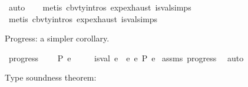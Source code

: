 \begin{isabellebody}
\ auto\isanewline
\ \ \isamarkupfalse%
\ {\isacharparenleft}{\kern0pt}metis\ cbv{\isacharunderscore}{\kern0pt}ty{\isachardot}{\kern0pt}intros{\isacharparenleft}{\kern0pt}{}{\isacharparenright}{\kern0pt}\ exp{\isachardot}{\kern0pt}exhaust\ is{\isacharunderscore}{\kern0pt}val{\isachardot}{\kern0pt}simps{\isacharparenleft}{\kern0pt}{}{\isacharcomma}{\kern0pt}{}{\isacharcomma}{\kern0pt}{}{\isacharparenright}{\kern0pt}{\isacharparenright}{\kern0pt}\isanewline
\ \ \isamarkupfalse%
\ {\isacharparenleft}{\kern0pt}metis\ cbv{\isacharunderscore}{\kern0pt}ty{\isachardot}{\kern0pt}intros{\isacharparenleft}{\kern0pt}{}{\isacharparenright}{\kern0pt}\ exp{\isachardot}{\kern0pt}exhaust\ is{\isacharunderscore}{\kern0pt}val{\isachardot}{\kern0pt}simps{\isacharparenleft}{\kern0pt}{}{\isacharcomma}{\kern0pt}{}{\isacharcomma}{\kern0pt}{}{\isacharparenright}{\kern0pt}{\isacharparenright}{\kern0pt}\isanewline
{}\isamarkupfalse%
%
\endisatagproof
{\isafoldproof}%
%
\isadelimproof
%
\endisadelimproof
%
\begin{isamarkuptext}%
Progress: a simpler corollary.%
\end{isamarkuptext}\isamarkuptrue%
\isamarkupfalse%
\ progress{\isacharprime}{\kern0pt}{\isacharcolon}{\kern0pt}\isanewline
\ \ \ {\isachardoublequoteopen}{\isacharbrackleft}{\kern0pt}{\isacharbrackright}{\kern0pt}\ {\isasymturnstile}{\isacharbraceleft}{\kern0pt}P{\isacharbraceright}{\kern0pt}\ e\ {\isacharcolon}{\kern0pt}\ {\isasymtau}{\isachardoublequoteclose}\isanewline
\ \ \ {\isachardoublequoteopen}is{\isacharunderscore}{\kern0pt}val\ e\ {\isasymor}\ {\isacharparenleft}{\kern0pt}{\isasymexists}e{\isacharprime}{\kern0pt}{\isachardot}{\kern0pt}\ e\ {\isacharminus}{\kern0pt}{\isachargreater}{\kern0pt}{\isacharbraceleft}{\kern0pt}P{\isacharbraceright}{\kern0pt}\ e{\isacharprime}{\kern0pt}{\isacharparenright}{\kern0pt}{\isachardoublequoteclose}\isanewline
%
\isadelimproof
%
\endisadelimproof
%
\isatagproof
{}\isamarkupfalse%
\ assms\ progress\ \isamarkupfalse%
\ auto%
\endisatagproof
{\isafoldproof}%
%
\isadelimproof
%
\endisadelimproof
%
\isadelimdocument
%
\endisadelimdocument
%
\isatagdocument
%
\isamarkuptrue%
%
\endisatagdocument
{\isafolddocument}%
%
\isadelimdocument
%
\endisadelimdocument
%
\begin{isamarkuptext}%
Type soundness theorem:

\end{isamarkuptext}
\end{isabellebody}
